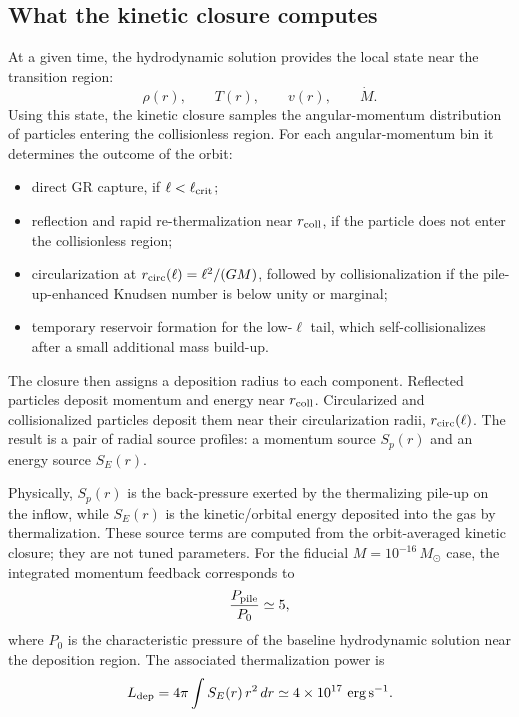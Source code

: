 \documentclass[12pt]{article}
\newcommand{\Msun}{M_\odot}
\newcommand{\Mdot}{\dot{M}}
\newcommand{\rcoll}{r_{\rm coll}}
\newcommand{\lcrit}{\ell_{\rm crit}}
\begin{document}
\subsection{What the kinetic closure computes}

At a given time, the hydrodynamic solution provides the local state near
the transition region:
\begin{equation}
  \rho(r),\qquad T(r),\qquad v(r),\qquad \Mdot .
\end{equation}
Using this state, the kinetic closure samples the angular-momentum
distribution of particles entering the collisionless region. For each
angular-momentum bin it determines the outcome of the orbit:
\begin{itemize}
  \item direct GR capture, if $\ell < \lcrit$;
  \item reflection and rapid re-thermalization near $\rcoll$, if the
        particle does not enter the collisionless region;
  \item circularization at $r_{\rm circ}(\ell) = \ell^2/(GM)$, followed
        by collisionalization if the pile-up-enhanced Knudsen number is
        below unity or marginal;
  \item temporary reservoir formation for the low-$\ell$ tail, which
        self-collisionalizes after a small additional mass build-up.
\end{itemize}

The closure then assigns a deposition radius to each component. Reflected
particles deposit momentum and energy near $\rcoll$. Circularized and
collisionalized particles deposit them near their circularization radii,
$r_{\rm circ}(\ell)$. The result is a pair of radial source profiles:
a momentum source $S_p(r)$ and an energy source $S_E(r)$.

Physically, $S_p(r)$ is the back-pressure exerted by the thermalizing
pile-up on the inflow, while $S_E(r)$ is the kinetic/orbital energy
deposited into the gas by thermalization. These source terms are
computed from the orbit-averaged kinetic closure; they are not tuned
parameters. For the fiducial $M=10^{-16}\,\Msun$ case, the integrated
momentum feedback corresponds to
\begin{equation}
  \frac{P_{\rm pile}}{P_0} \simeq 5,
\end{equation}
where $P_0$ is the characteristic pressure of the baseline hydrodynamic
solution near the deposition region. The associated thermalization
power is
\begin{equation}
  L_{\rm dep}
  =
  4\pi\int S_E(r)\,r^2\,dr
  \simeq 4\times 10^{17}\ {\rm erg\,s^{-1}} .
\end{equation}
\end{document}
